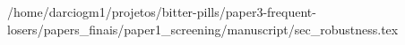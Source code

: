 /home/darciogm1/projetos/bitter-pills/paper3-frequent-losers/papers_finais/paper1_screening/manuscript/sec_robustness.tex
